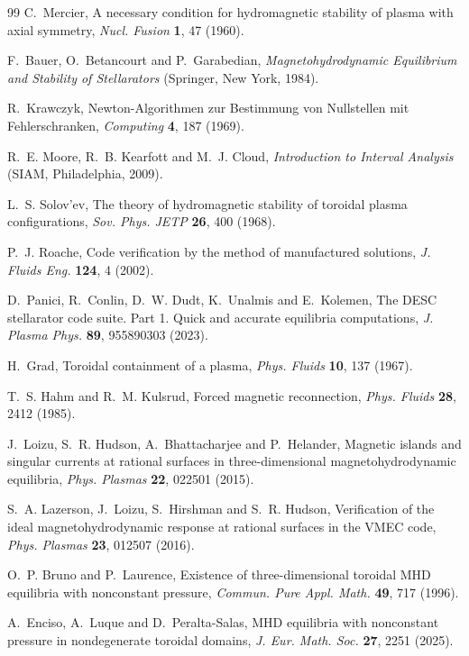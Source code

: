 \documentclass[11pt]{article}
\begin{document}
\begin{thebibliography}{99}
C.~Mercier, A necessary condition for hydromagnetic stability of plasma with
axial symmetry, \emph{Nucl. Fusion} \textbf{1}, 47 (1960).

F.~Bauer, O.~Betancourt and P.~Garabedian, \emph{Magnetohydrodynamic
Equilibrium and Stability of Stellarators} (Springer, New York, 1984).

R.~Krawczyk, Newton-Algorithmen zur Bestimmung von Nullstellen mit
Fehlerschranken, \emph{Computing} \textbf{4}, 187 (1969).

R.~E. Moore, R.~B. Kearfott and M.~J. Cloud, \emph{Introduction to Interval
Analysis} (SIAM, Philadelphia, 2009).

L.~S. Solov'ev, The theory of hydromagnetic stability of toroidal plasma
configurations, \emph{Sov. Phys. JETP} \textbf{26}, 400 (1968).

P.~J. Roache, Code verification by the method of manufactured solutions,
\emph{J. Fluids Eng.} \textbf{124}, 4 (2002).

D.~Panici, R.~Conlin, D.~W. Dudt, K.~Unalmis and E.~Kolemen, The DESC
stellarator code suite. Part 1. Quick and accurate equilibria computations,
\emph{J. Plasma Phys.} \textbf{89}, 955890303 (2023).

H.~Grad, Toroidal containment of a plasma, \emph{Phys. Fluids} \textbf{10}, 137
(1967).

T.~S. Hahm and R.~M. Kulsrud, Forced magnetic reconnection, \emph{Phys. Fluids}
\textbf{28}, 2412 (1985).

J.~Loizu, S.~R. Hudson, A.~Bhattacharjee and P.~Helander, Magnetic islands and
singular currents at rational surfaces in three-dimensional
magnetohydrodynamic equilibria, \emph{Phys. Plasmas} \textbf{22}, 022501
(2015).

S.~A. Lazerson, J.~Loizu, S.~Hirshman and S.~R. Hudson, Verification of the
ideal magnetohydrodynamic response at rational surfaces in the VMEC code,
\emph{Phys. Plasmas} \textbf{23}, 012507 (2016).

O.~P. Bruno and P.~Laurence, Existence of three-dimensional toroidal MHD
equilibria with nonconstant pressure, \emph{Commun. Pure Appl. Math.}
\textbf{49}, 717 (1996).

A.~Enciso, A.~Luque and D.~Peralta-Salas, MHD equilibria with nonconstant
pressure in nondegenerate toroidal domains, \emph{J. Eur. Math. Soc.}
\textbf{27}, 2251 (2025).


\end{thebibliography}
\end{document}
